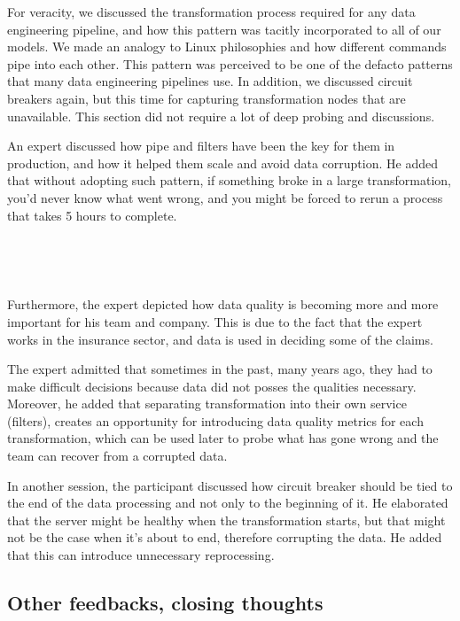 \documentclass{bmcart}
\begin{document}
For veracity, we discussed the transformation process required for any data engineering pipeline, and how this pattern was tacitly incorporated to all of our models. We made an analogy to Linux philosophies and how different commands pipe into each other. This pattern was perceived to be one of the defacto patterns that many data engineering pipelines use. In addition, we discussed circuit breakers again, but this time for capturing transformation nodes that are unavailable. This section did not require a lot of deep probing and discussions. 


An expert discussed how pipe and filters have been the key for them in production, and how it helped them scale and avoid data corruption. He added that without adopting such pattern, if something broke in a large transformation, you'd never know what went wrong, and you might be forced to rerun a process that takes 5 hours to complete. 

\,

\setlength{\fboxsep}{0.7em}
\noindent{}

\,

Furthermore, the expert depicted how data quality is becoming more and more important for his team and company. This is due to the fact that the expert works in the insurance sector, and data is used in deciding some of the claims. 

The expert admitted that sometimes in the past, many years ago, they had to make difficult decisions because data did not posses the qualities necessary. Moreover, he added that separating transformation into their own service (filters), creates an opportunity for introducing data quality metrics for each transformation, which can be used later to probe what has gone wrong and the team can recover from a corrupted data.

In another session, the participant discussed how circuit breaker should be tied to the end of the data processing and not only to the beginning of it. He elaborated that the server might be healthy when the transformation starts, but that might not be the case when it's about to end, therefore corrupting the data. He added that this can introduce unnecessary reprocessing. 



\subsection{Other feedbacks, closing thoughts}
\end{document}
